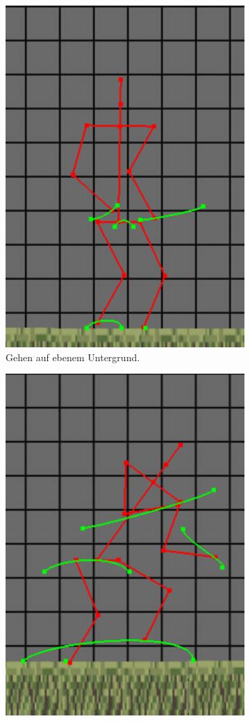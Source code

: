\begin{figure}
    \centering
    \begin{subfigure}[t]{.4\linewidth}
        \centering
        \includegraphics[width=0.75\linewidth]{images/even_ground_slow.png}
        \caption{Gehen auf ebenem Untergrund.}
        \label{even_slow}
    \end{subfigure}
    \begin{subfigure}[t]{.4\linewidth}
        \centering
        \includegraphics[width=0.75\linewidth]{images/even_ground_fast2.png}

\end{subfigure}
\end{figure}
